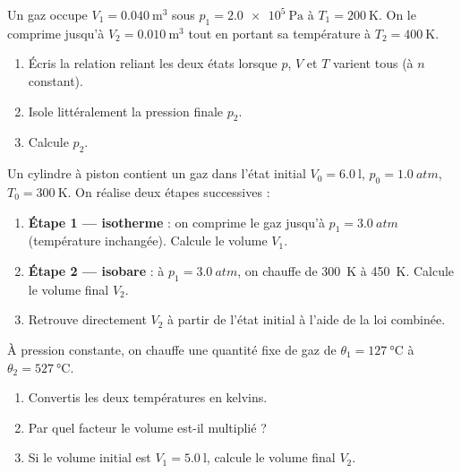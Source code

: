 \documentclass[11pt,a4paper]{article}
\begin{document}
\begin{exo}[la loi combinée $pV/T=\text{cste}$]
Un gaz occupe $V_1=\qty{0.040}{\meter\cubed}$ sous $p_1=\qty{2.0e5}{\pascal}$ à $T_1=\qty{200}{\kelvin}$.
On le comprime jusqu'à $V_2=\qty{0.010}{\meter\cubed}$ tout en portant sa température à
$T_2=\qty{400}{\kelvin}$.
\begin{enumerate}[label=\alph*)]
  \item Écris la relation reliant les deux états lorsque $p$, $V$ et $T$ varient tous (à $n$ constant).
  \item Isole littéralement la pression finale $p_2$.
  \item Calcule $p_2$.
\end{enumerate}
\end{exo}

\begin{exo}
Un cylindre à piston contient un gaz dans l'état initial $V_0=\qty{6.0}{\litre}$, $p_0=\qty{1.0}{atm}$,
$T_0=\qty{300}{\kelvin}$. On réalise deux étapes successives :
\begin{enumerate}[label=\alph*)]
  \item \textbf{Étape 1 — isotherme} : on comprime le gaz jusqu'à $p_1=\qty{3.0}{atm}$ (température
        inchangée). Calcule le volume $V_1$.
  \item \textbf{Étape 2 — isobare} : à $p_1=\qty{3.0}{atm}$, on chauffe de \qty{300}{\kelvin} à
        \qty{450}{\kelvin}. Calcule le volume final $V_2$.
  \item Retrouve directement $V_2$ à partir de l'état initial à l'aide de la loi combinée.
\end{enumerate}
\end{exo}

\begin{exo}
À pression constante, on chauffe une quantité fixe de gaz de $\theta_1=\qty{127}{\degreeCelsius}$ à
$\theta_2=\qty{527}{\degreeCelsius}$.
\begin{enumerate}[label=\alph*)]
  \item Convertis les deux températures en kelvins.
  \item Par quel facteur le volume est-il multiplié ?
  \item Si le volume initial est $V_1=\qty{5.0}{\litre}$, calcule le volume final $V_2$.
\end{enumerate}
\end{exo}
\end{document}
